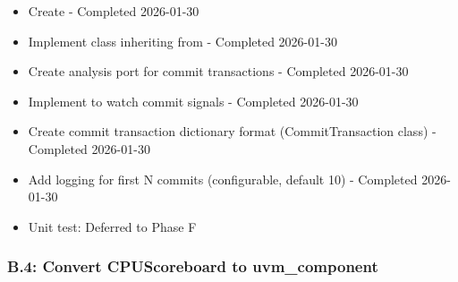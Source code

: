 \begin{record}

\begin{itemize}
\tightlist
\item[$\boxtimes$]
  Create  - Completed
  2026-01-30
\item[$\boxtimes$]
  Implement  class inheriting from
   - Completed 2026-01-30
\item[$\boxtimes$]
  Create analysis port for commit transactions - Completed 2026-01-30
\item[$\boxtimes$]
  Implement  to watch commit signals - Completed
  2026-01-30
\item[$\boxtimes$]
  Create commit transaction dictionary format (CommitTransaction class)
  - Completed 2026-01-30
\item[$\boxtimes$]
  Add logging for first N commits (configurable, default 10) - Completed
  2026-01-30
\item[$\boxtimes$]
  Unit test: Deferred to Phase F
\end{itemize}

\end{record}

\subsubsection{\texorpdfstring{B.4: Convert CPUScoreboard to
uvm\_\allowbreak{}component}{B.4: Convert CPUScoreboard to uvm\_component}}\label{cr:status:pyuvm-migration:b4-convert-cpuscoreboard-to-uvm-component}


